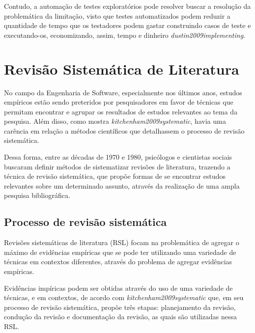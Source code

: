Contudo, a automação de testes exploratórios pode resolver buscar a resolução da problemática da limitação, visto que testes automatizados podem reduzir a quantidade de tempo que os testadores podem gastar construindo casos de teste e executando-os, economizando, assim, tempo e dinheiro \textit{dustin2009implementing}. 

\section{Revisão Sistemática de Literatura}

\par No campo da Engenharia de Software, especialmente nos últimos anos, estudos empíricos estão sendo preteridos por pesquisadores em favor de técnicas que permitam encontrar e agrupar os resultados de estudos relevantes ao tema da pesquisa. Além disso, como mostra \textit{kitchenham2009systematic}, havia uma carência em relação a métodos científicos que detalhassem o processo de revisão sistemática. 

\par Dessa forma, entre as décadas de 1970 e 1980, psicólogos e cientistas sociais buscaram definir métodos de sistematizar revisões de literatura, trazendo a técnica de revisão sistemática, que propõe formas de se encontrar estudos relevantes sobre um determinado assunto, através da realização de uma ampla pesquisa bibliográfica. 


\subsection{Processo de revisão sistemática}

Revisões sistemáticas de literatura (RSL) focam na problemática de agregar o máximo de evidências empíricas que se pode ter utilizando uma variedade de técnicas em contextos diferentes, através do problema de agregar evidências empíricas.

Evidências impíricas podem ser obtidas através do uso de uma variedade de técnicas, e em contextos, de acordo com \textit{kitchenham2009systematic} que, em seu processo de revisão sistemática, propõe três etapas: planejamento da revisão, condução da revisão e documentação da revisão, as quais são utilizadas nessa RSL. 

